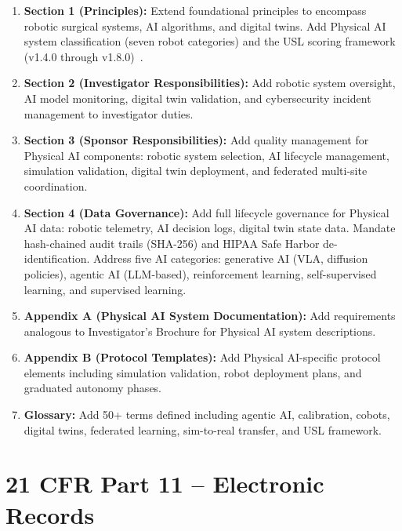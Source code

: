 \documentclass[11pt,letterpaper]{article}
\begin{document}
\begin{enumerate}[label=(\alph*)]
\item \textbf{Section 1 (Principles):} Extend foundational principles to
  encompass robotic surgical systems, AI algorithms, and digital twins.
  Add Physical AI system classification (seven robot categories) and the USL
  scoring framework (v1.4.0 through v1.8.0)~\cite{usl2026}.

\item \textbf{Section 2 (Investigator Responsibilities):} Add robotic system
  oversight, AI model monitoring, digital twin validation, and cybersecurity
  incident management to investigator duties.

\item \textbf{Section 3 (Sponsor Responsibilities):} Add quality management
  for Physical AI components: robotic system selection, AI lifecycle
  management, simulation validation, digital twin deployment, and federated
  multi-site coordination.

\item \textbf{Section 4 (Data Governance):} Add full lifecycle governance for
  Physical AI data: robotic telemetry, AI decision logs, digital twin state
  data. Mandate hash-chained audit trails (SHA-256) and HIPAA Safe Harbor
  de-identification. Address five AI categories: generative AI (VLA, diffusion
  policies), agentic AI (LLM-based), reinforcement learning, self-supervised
  learning, and supervised learning.

\item \textbf{Appendix A (Physical AI System Documentation):} Add requirements
  analogous to Investigator's Brochure for Physical AI system descriptions.

\item \textbf{Appendix B (Protocol Templates):} Add Physical AI-specific
  protocol elements including simulation validation, robot deployment plans,
  and graduated autonomy phases.

\item \textbf{Glossary:} Add 50+ terms defined including agentic AI,
  calibration, cobots, digital twins, federated learning, sim-to-real
  transfer, and USL framework.
\end{enumerate}

\section{21 CFR Part 11 -- Electronic Records}
\end{document}
